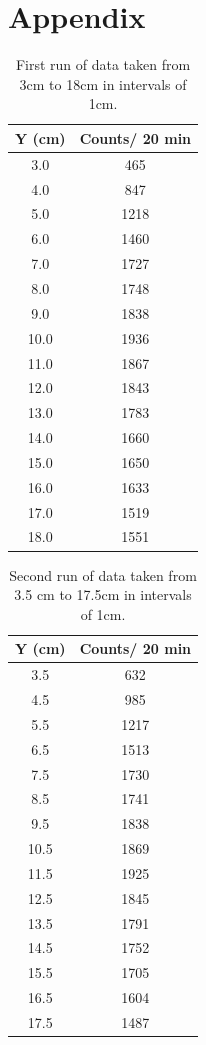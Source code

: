 \section{Appendix}
\begin{table}[H]
\begin{tabular}{|c|c|}\hline
Y (cm) & Counts/ 20 min\\ \hline
3.0 & 465  \\ \hline
4.0 &  847 \\ \hline
5.0 &  1218 \\ \hline
6.0 &  1460 \\ \hline
7.0 &  1727\\ \hline
8.0 &  1748 \\ \hline
9.0 &  1838\\ \hline
10.0 &  1936\\ \hline
11.0 &  1867\\ \hline
12.0 &  1843\\ \hline
13.0 &  1783\\ \hline
14.0 &  1660\\ \hline
15.0 &  1650\\ \hline
16.0 & 1633 \\ \hline
17.0 &  1519\\ \hline
18.0 &  1551\\ \hline
\end {tabular}
\caption{First run of data taken from 3cm to 18cm in intervals of 1cm.}
\end{table}

\begin{table}[H]
\begin{tabular}{|c|c|}\hline
Y (cm) & Counts/ 20 min\\ \hline
3.5 & 632 \\ \hline
4.5 &  985 \\ \hline
5.5 &  1217 \\ \hline
6.5 &  1513 \\ \hline
7.5 &  1730\\ \hline
8.5 &  1741 \\ \hline
9.5 &  1838\\ \hline
10.5 &  1869\\ \hline
11.5 &  1925\\ \hline
12.5 &  1845\\ \hline
13.5 &  1791\\ \hline
14.5 &  1752\\ \hline
15.5 &  1705\\ \hline
16.5 & 1604\\ \hline
17.5 &  1487\\ \hline
\end{tabular}
\caption{Second run of data taken from 3.5 cm to 17.5cm in intervals of 1cm.}
\end{table}




